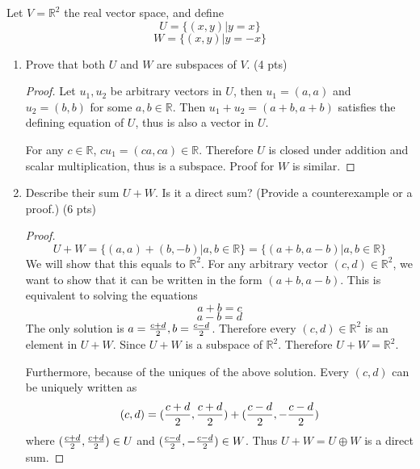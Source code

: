 \documentclass{amsart}
\begin{document}
	
\vspace{2em}
Let $V=\mathbb{R}^2$ the real vector space, and define
\[U = \{(x,y) | y=x\}\]
\[W = \{(x,y) | y=-x\}\]

\begin{enumerate}
	\item Prove that both $U$ and $W$ are subspaces of $V$. (4 pts)
	\begin{proof}
		Let $u_1,u_2$ be arbitrary vectors in $ U$, then $u_1=(a,a)$ and $u_2=(b,b)$ for some $a,b\in\mathbb{R}$. Then $u_1+u_2=(a+b,a+b)$ satisfies the defining equation of $U$, thus is also a vector in $U$.
		
		For any $c\in\mathbb{R}$, $cu_1 = (ca,ca)\in \mathbb{R}$. Therefore $U$ is closed under addition and scalar multiplication, thus is a subspace. Proof for $W$ is similar.
	\end{proof}
	\item Describe their sum $U+W$. Is it a direct sum? (Provide a counterexample or a proof.) (6 pts)
	\begin{proof}
		\[U+W = \{(a,a)+(b,-b)|a,b\in\mathbb{R}\}=\{(a+b,a-b)|a,b\in\mathbb{R}\}\]
		We will show that this equals to $\mathbb{R}^2$. For any arbitrary vector $(c,d)\in\mathbb{R}^2$, we want to show that it can be written in the form $(a+b,a-b)$. This is equivalent to solving the equations
		\[a+b = c\]
		\[a-b = d\]
		The only solution is $a={c+d\over 2}, b = {c-d\over 2}$. Therefore every $(c,d)\in\mathbb{R}^2$ is an element in $U+W$. Since $U+W$ is a subspace of $\mathbb{R}^2$. Therefore $U+W = \mathbb{R}^2$.
		
		Furthermore, because of the uniques of the above solution. Every $(c,d)$ can be uniquely written as
		\[(c,d) = ({c+d\over 2},{c+d\over 2})+({c-d\over 2},-{c-d\over 2})\]
		where $({c+d\over 2},{c+d\over 2})\in U$ and $({c-d\over 2},-{c-d\over 2})\in W$. Thus $U+W = U\oplus W$ is a direct sum.
	\end{proof}
\end{enumerate}


%
%
\end{document}
